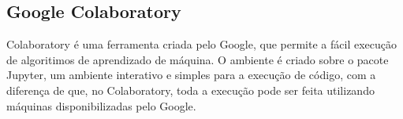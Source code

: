\subsection{Google Colaboratory}

Colaboratory é uma ferramenta criada pelo Google, que permite a fácil execução de algoritimos de aprendizado de máquina. O ambiente é criado sobre o pacote Jupyter, um ambiente interativo e simples para a execução de código, com a diferença de que, no Colaboratory, toda a execução pode ser feita utilizando máquinas disponibilizadas pelo Google.

